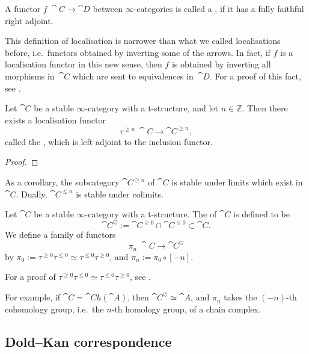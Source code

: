\begin{definition}
    A functor $f\:\cat{C}\to\cat{D}$ between $\infty$-categories
    is called a , if 
    it has a fully faithful right adjoint.
\end{definition}

\begin{remark}
    This definition of localisation
    is narrower than what we called localisations before,
    i.e.\ functors obtained by inverting some of the arrows.
    In fact, if $f$ is a localisation functor in this new sense,
    then $f$ is obtained by inverting all morphisms in~$\cat{C}$
    which are sent to equivalences in~$\cat{D}$.
    For a proof of this fact, see \cite[Proposition~5.2.7.12]{htt}. \varqed
\end{remark}

\begin{theorem}
    Let $\cat{C}$ be a stable $\infty$-category with a t-structure,
    and let $n\in\mathbb Z$. Then there exists a localisation functor
    \[ \tau^{\geq n}\:\cat{C}\to\cat{C}^{\geq n}, \]
    called the , which is left adjoint
    to the inclusion functor.
\end{theorem}

\begin{proof}
    \nyw
\end{proof}

As a corollary, the subcategory $\cat{C}^{\geq n}$ of $\cat{C}$
is stable under limits which exist in $\cat{C}$.
Dually, $\cat{C}^{\leq n}$ is stable under colimits.

\begin{definition}
    Let $\cat{C}$ be a stable $\infty$-category with a t-structure.
    The  of $\cat{C}$ is defined to be 
    \[ \cat{C}^\heartsuit:=\cat{C}^{\geq0}\cap\cat{C}^{\leq0}\subset\cat{C}. \]
    We define a family of functors
    \[ \pi_n\:\cat{C}\to\cat{C}^\heartsuit \]
    by $\pi_0:=\tau^{\geq0}\tau^{\leq0}\simeq\tau^{\leq0}\tau^{\geq0}$,
    and $\pi_n:=\pi_0\circ[-n]$.
\end{definition}

For a proof of $\tau^{\geq0}\tau^{\leq0}\simeq\tau^{\leq0}\tau^{\geq0}$,
see \cite[Proposition~1.2.1.10]{ha}.

For example, if $\cat{C}=\cat{Ch}(\cat{A})$,
then $\cat{C}^\heartsuit\simeq\cat{A}$,
and $\pi_n$ takes the $(-n)$-th cohomology group,
i.e.\ the $n$-th homology group, of a chain complex.

\subsection{Dold--Kan correspondence}

